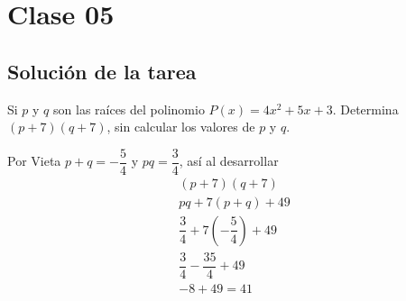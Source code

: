 \section{Clase 05}\label{sec:clase-05}

    \subsection{Solución de la tarea}
    \begin{section-problem}
        Si $p$ y $q$ son las raíces del polinomio $P(x) = 4x^2 + 5x + 3$.
        Determina $(p + 7)(q + 7)$, sin calcular los valores de $p$ y $q$.
    \end{section-problem}
    \begin{solution}
        Por Vieta $p + q = -\dfrac{5}{4}$ y $pq = \dfrac{3}{4}$, así al desarrollar
        \begin{gather*}
        (p + 7)(q + 7) \\
        pq + 7(p + q) + 49\\
        \dfrac{3}{4} + 7\left(- \dfrac{5}{4}\right) + 49\\
        \dfrac{3}{4} - \dfrac{35}{4} + 49\\
        -8 + 49 = \boxed{41}
        \end{gather*}
    \end{solution}

